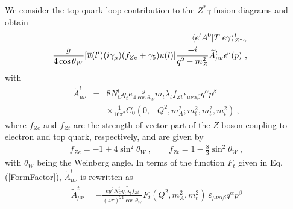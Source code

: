 \documentclass[final,5p,times,twocolumn]{elsarticle}
\newcommand{\bea}{\begin{eqnarray}}
\newcommand{\eea}{\end{eqnarray}}
\begin{document}
We consider the top quark loop contribution to the $Z^*\gamma$ fusion diagrams and obtain
\bea
&&\hspace{-1.3cm}\langle e' A^0|T|e\gamma\rangle^t_{Z^*\gamma}\nonumber\\
&&\hspace{-1.3cm}=\frac{g}{4\cos\theta_W}[\overline{u}(l')
(i\gamma_\mu)(f_{Ze}+\gamma_5)u(l)]\frac{-i}{q^2-m_Z^2}\widetilde{A}^t_{\mu\nu}
\epsilon^\nu(p)~, \label{ContributionZgamma}
\eea
with
\bea
\widetilde{A}^t_{\mu\nu}&=&8 N^t_Cq_t e\frac{g}{4\cos\theta_W}m_t\lambda_t f_{Zt}\epsilon_{\mu\nu\alpha\beta}q^\alpha p^\beta \nonumber\\
&&\times\frac{1}{16\pi^2}
C_0(0, -Q^2,m_A^2; m_t^2,m_t^2,m_t^2)~,
\eea
where $f_{Ze}$ and $f_{Zt}$ are the strength of vector part of the $Z$-boson coupling to 
electron and top quark, respectively, and are given by
\bea
f_{Ze}=-1+4\sin^2\theta_W~,\qquad f_{Zt}=1-\frac{8}{3}\sin^2\theta_W~,\label{fZefZt}
\eea
with $\theta_W$ being the Weinberg angle. In terms of the function  $F_t$ given in Eq.(\ref{FormFactor}),  
$\widetilde{A}^t_{\mu\nu}$ is rewritten as 
\bea
\widetilde{A}^t_{\mu\nu}=-\frac{eg^2 N^t_Cq_t {\widetilde \lambda}_t f_{Zt}}{(4\pi)^24\cos\theta_W}F_t(Q^2,m_A^2, m_t^2)\ \varepsilon_{\mu\nu\alpha\beta}q^\alpha p^\beta
\eea


\end{document}
